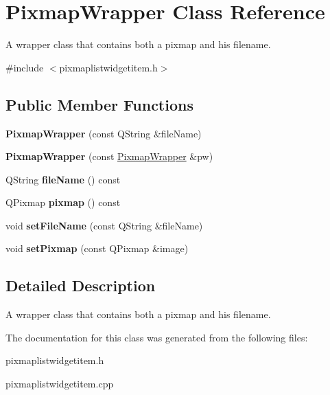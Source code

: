 \hypertarget{class_pixmap_wrapper}{
\section{PixmapWrapper Class Reference}
\label{class_pixmap_wrapper}
}


A wrapper class that contains both a pixmap and his filename.  




{\ttfamily \#include $<$pixmaplistwidgetitem.h$>$}

\subsection*{Public Member Functions}
\begin{DoxyCompactItemize}
\item 
\hypertarget{class_pixmap_wrapper_ad916f9d6c4486313c0053da8ac9174c8}{
{\bfseries PixmapWrapper} (const QString \&fileName)}
\label{class_pixmap_wrapper_ad916f9d6c4486313c0053da8ac9174c8}

\item 
\hypertarget{class_pixmap_wrapper_a299fddf17d80ce78b2eb3e8513f22e50}{
{\bfseries PixmapWrapper} (const \hyperlink{class_pixmap_wrapper}{PixmapWrapper} \&pw)}
\label{class_pixmap_wrapper_a299fddf17d80ce78b2eb3e8513f22e50}

\item 
\hypertarget{class_pixmap_wrapper_ab95933bf093509712813fdb14b4026ca}{
QString {\bfseries fileName} () const }
\label{class_pixmap_wrapper_ab95933bf093509712813fdb14b4026ca}

\item 
\hypertarget{class_pixmap_wrapper_a0562d18b9d69b46679574f2450e01bb3}{
QPixmap {\bfseries pixmap} () const }
\label{class_pixmap_wrapper_a0562d18b9d69b46679574f2450e01bb3}

\item 
\hypertarget{class_pixmap_wrapper_afb59b005810def28348713b200c6b838}{
void {\bfseries setFileName} (const QString \&fileName)}
\label{class_pixmap_wrapper_afb59b005810def28348713b200c6b838}

\item 
\hypertarget{class_pixmap_wrapper_a7e846aff20232979b31e3d8a18c2f13e}{
void {\bfseries setPixmap} (const QPixmap \&image)}
\label{class_pixmap_wrapper_a7e846aff20232979b31e3d8a18c2f13e}

\end{DoxyCompactItemize}


\subsection{Detailed Description}
A wrapper class that contains both a pixmap and his filename. 

The documentation for this class was generated from the following files:\begin{DoxyCompactItemize}
\item 
pixmaplistwidgetitem.h\item 
pixmaplistwidgetitem.cpp\end{DoxyCompactItemize}
